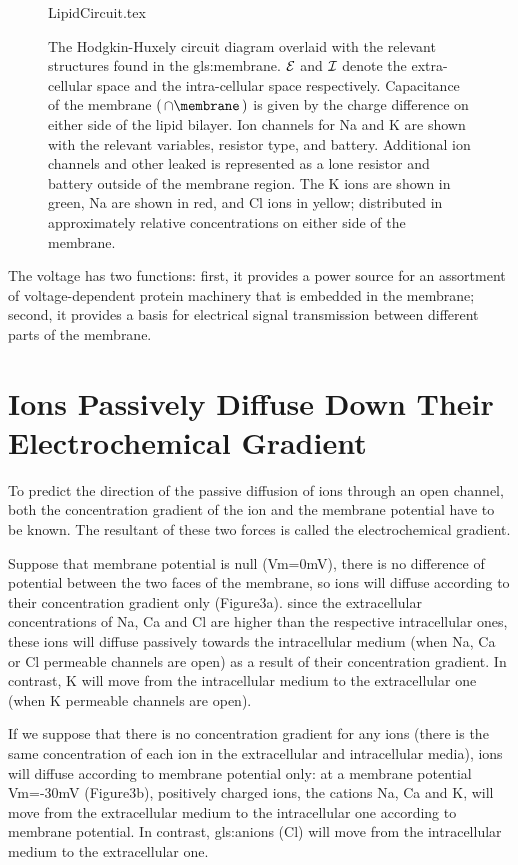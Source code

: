 \documentclass[../../Orator]{subfiles}
\begin{document}
\begin{figure}[ht]
    \centering
    {LipidCircuit.tex}
    \caption{The Hodgkin-Huxely circuit diagram overlaid with the relevant structures found in the \gls{gls:membrane}. \(\mathcal{E}\) and \(\mathcal{I}\) denote the extra-cellular space and the intra-cellular space respectively. Capacitance of the membrane \(\br{\unit{\cap\membrane}}\) is given by the charge difference on either side of the lipid bilayer. Ion channels for \gls{Na} and \gls{K} are shown with the relevant variables, resistor type, and battery. Additional ion channels and other leaked is represented as a lone resistor and battery outside of the membrane region. The \gls{K} ions are shown in green, \gls{Na} are shown in red, and \gls{Cl} ions in yellow; distributed in approximately relative concentrations on either side of the membrane. }\label{fig:MembraneCircut}
\end{figure}


The voltage has two functions: first, it provides a power source for an assortment of voltage-dependent protein machinery that is embedded in the membrane; second, it provides a basis for electrical signal transmission between different parts of the membrane.

\section{Ions Passively Diffuse Down Their Electrochemical Gradient}
To predict the direction of the passive diffusion of ions through an open channel, both the concentration gradient of the ion and the membrane potential have to be known. The resultant of these two forces is called the electrochemical gradient.

Suppose that membrane potential is null (Vm=0mV), there is no difference of potential between the two faces of the membrane, so ions will diffuse according to their concentration gradient only (Figure3a). since the extracellular concentrations of \gls{Na}, \gls{Ca} and \gls{Cl} are higher than the respective intracellular ones, these ions will diffuse passively towards the intracellular medium (when \gls{Na}, \gls{Ca} or \gls{Cl} permeable channels are open) as a result of their concentration gradient. In contrast, \gls{K} will move from the intracellular medium to the extracellular one (when \gls{K} permeable channels are open). 

If we suppose that there is no concentration gradient for any ions (there is the same concentration of each ion in the extracellular and intracellular media), ions will diffuse according to membrane potential only: at a membrane potential Vm=-30mV (Figure3b), positively charged ions, the cations \gls{Na}, \gls{Ca} and \gls{K}, will move from the extracellular medium to the intracellular one according to membrane potential. In contrast, \glspl{gls:anion} (\gls{Cl}) will move from the intracellular medium to the extracellular one. 
 
\end{document}
